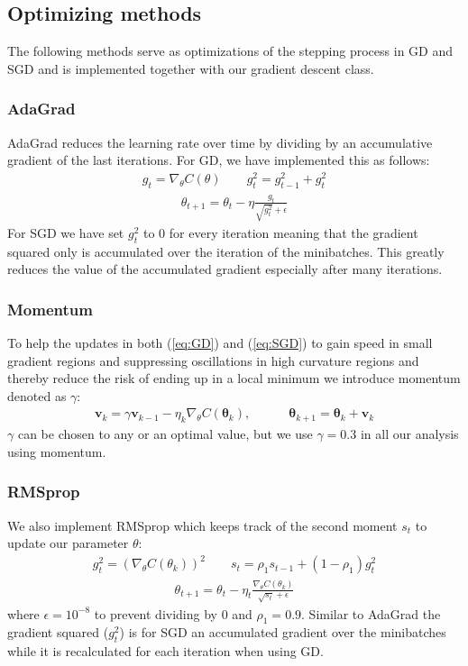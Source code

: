\documentclass[11pt]{article}
\begin{document}
\subsection{Optimizing methods}
The following methods serve as optimizations of the stepping process in GD and SGD and is implemented together with our gradient descent class.
\subsubsection*{AdaGrad}
AdaGrad reduces the learning rate over time by dividing by an accumulative gradient of the last iterations. For GD, we have implemented this as follows:
\begin{align*}
    g_t = \nabla_\theta C(\theta) \quad\quad g_t^2 = g_{t-1}^2 + g_t^2
\end{align*}
\begin{align*}
    \theta_{t+1} = \theta_t - \eta \frac{g_t}{\sqrt{g_t^2} + \epsilon}
\end{align*}
For SGD we have set $g_t^2$ to 0 for every iteration meaning that the gradient squared only is accumulated over the iteration of the minibatches. This greatly reduces the value of the accumulated gradient especially after many iterations.
\subsubsection*{Momentum}
To help the updates in both (\ref{eq:GD}) and (\ref{eq:SGD}) to gain speed in small gradient regions and suppressing oscillations in high curvature regions and thereby reduce the risk of ending up in a local minimum we introduce momentum denoted as $\gamma$:
\begin{align}
    \label{eq:GD_mom}
    \boldsymbol{v}_{k} = \gamma\boldsymbol{v}_{k-1} - \eta_k \nabla_\theta C(\boldsymbol{\theta}_k),\quad\quad\quad\boldsymbol{\theta}_{k+1} = \boldsymbol{\theta}_k + \boldsymbol{v}_k
\end{align}
$\gamma$ can be chosen to any or an optimal value, but we use $\gamma=0.3$ in all our analysis using momentum.

\subsubsection*{RMSprop}
We also implement RMSprop which keeps track of the second moment $s_t$ to update our parameter $\theta$:
\begin{align*}
    g_t^2 = (\nabla_\theta C(\theta_k))^2  \quad\quad s_t = \rho_1 s_{t-1} + (1- \rho_1)g_t^2
\end{align*}
\begin{align*}
    \theta_{t+1} = \theta_t - \eta_t \frac{\nabla_\theta C(\theta_k)}{\sqrt{s_t} + \epsilon }
\end{align*}
where $\epsilon=10^{-8}$ to prevent dividing by 0 and $\rho_1 = 0.9$. Similar to AdaGrad the gradient squared ($g_t^2$) is for SGD an accumulated gradient over the minibatches while it is recalculated for each iteration when using GD.
\end{document}
